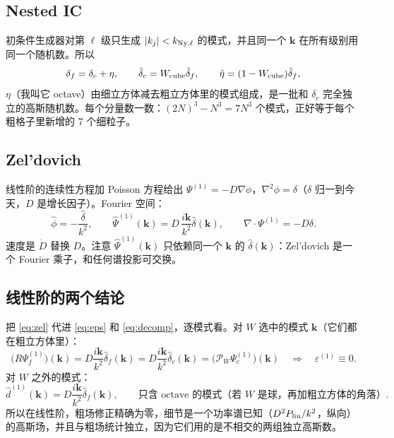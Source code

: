 \documentclass[11pt,UTF8,fontset=none]{ctexart}
\newcommand{\kk}{\mathbf{k}}
\newcommand{\Ny}{{\rm Ny}}
\newcommand{\PW}{\mathcal P_W}
\begin{document}
\subsection{Nested IC}

初条件生成器对第 $\ell$ 级只生成 $|k_j|<k_{\Ny,\ell}$ 的模式，并且同一个 $\kk$ 在所有级别用同一个随机数。所以
\begin{equation}
\delta_f=\delta_c+\eta,\qquad \hat\delta_c=W_{\rm cube}\hat\delta_f,\qquad \hat\eta=(1-W_{\rm cube})\hat\delta_f,
\end{equation}
$\eta$（我叫它 octave）由细立方体减去粗立方体里的模式组成，是一批和 $\delta_c$ 完全独立的高斯随机数。每个分量数一数：$(2N)^3-N^3=7N^3$ 个模式，正好等于每个粗格子里新增的 7 个细粒子。

\subsection{Zel'dovich}

线性阶的连续性方程加 Poisson 方程给出 $\Psi^{(1)}=-D\nabla\phi$，$\nabla^2\phi=\delta$（$\delta$ 归一到今天，$D$ 是增长因子）。Fourier 空间：
\begin{equation}
\hat\phi=-\frac{\hat\delta}{k^2},\qquad \hat\Psi^{(1)}(\kk)=D\,\frac{i\kk}{k^2}\hat\delta(\kk),\qquad \nabla\cdot\Psi^{(1)}=-D\delta .
\label{eq:zel}
\end{equation}
速度是 $\dot D$ 替换 $D$。注意 $\hat\Psi^{(1)}(\kk)$ 只依赖同一个 $\kk$ 的 $\hat\delta(\kk)$：Zel'dovich 是一个 Fourier 乘子，和任何谱投影可交换。

\subsection{线性阶的两个结论}

把 \eqref{eq:zel} 代进 \eqref{eq:eps} 和 \eqref{eq:decomp}，逐模式看。对 $W$ 选中的模式 $\kk$（它们都在粗立方体里）：
\begin{equation}
\big(R\Psi^{(1)}_f\big)(\kk)=D\frac{i\kk}{k^2}\hat\delta_f(\kk)=D\frac{i\kk}{k^2}\hat\delta_c(\kk)=\big(\PW\Psi^{(1)}_c\big)(\kk)
\quad\Longrightarrow\quad \varepsilon^{(1)}\equiv0 .
\end{equation}
对 $W$ 之外的模式：
\begin{equation}
\hat d^{(1)}(\kk)=D\frac{i\kk}{k^2}\hat\delta_f(\kk),\qquad \text{只含 octave 的模式（若 $W$ 是球，再加粗立方体的角落）}.
\end{equation}
所以在线性阶，粗场修正精确为零，细节是一个功率谱已知（$D^2P_{\rm lin}/k^2$，纵向）的高斯场，并且与粗场统计独立，因为它们用的是不相交的两组独立高斯数。
\end{document}
